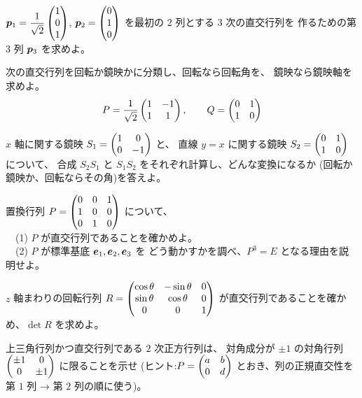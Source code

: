 \begin{mondai}[基本]\label{q:orth-ex4}
$\bm{p}_1 = \dfrac{1}{\sqrt{2}}\begin{pmatrix}1 \\ 0 \\ 1\end{pmatrix}$,
$\bm{p}_2 = \begin{pmatrix}0 \\ 1 \\ 0\end{pmatrix}$ を最初の $2$ 列とする $3$ 次の直交行列を
作るための第 $3$ 列 $\bm{p}_3$ を求めよ。
\end{mondai}

\begin{mondai}[標準]\label{q:orth-ex5}
次の直交行列を回転か鏡映かに分類し、回転なら回転角を、
鏡映なら鏡映軸を求めよ。
\[
P = \frac{1}{\sqrt{2}}\begin{pmatrix}1 & -1 \\ 1 & 1\end{pmatrix}, \qquad
Q = \begin{pmatrix}0 & 1 \\ 1 & 0\end{pmatrix}
\]
\end{mondai}

\begin{mondai}[標準]\label{q:orth-ex6}
$x$ 軸に関する鏡映 $S_1 = \begin{pmatrix}1 & 0 \\ 0 & -1\end{pmatrix}$ と、
直線 $y = x$ に関する鏡映 $S_2 = \begin{pmatrix}0 & 1 \\ 1 & 0\end{pmatrix}$ について、
合成 $S_2 S_1$ と $S_1 S_2$ をそれぞれ計算し、どんな変換になるか
(回転か鏡映か、回転ならその角)を答えよ。
\end{mondai}

\begin{mondai}[標準]\label{q:orth-ex7}
置換行列 $P = \begin{pmatrix}0 & 0 & 1 \\ 1 & 0 & 0 \\ 0 & 1 & 0\end{pmatrix}$ について、\\
　(1) $P$ が直交行列であることを確かめよ。\\
　(2) $P$ が標準基底 $\bm{e}_1, \bm{e}_2, \bm{e}_3$ を
どう動かすかを調べ、$P^3 = E$ となる理由を説明せよ。
\end{mondai}

\begin{mondai}[標準]\label{q:orth-ex8}
$z$ 軸まわりの回転行列
$R = \begin{pmatrix}\cos\theta & -\sin\theta & 0 \\ \sin\theta & \cos\theta & 0 \\ 0 & 0 & 1\end{pmatrix}$
が直交行列であることを確かめ、$\det R$ を求めよ。
\end{mondai}

\begin{mondai}[発展]\label{q:orth-ex9}
上三角行列かつ直交行列である $2$ 次正方行列は、
対角成分が $\pm 1$ の対角行列
$\begin{pmatrix}\pm 1 & 0 \\ 0 & \pm 1\end{pmatrix}$ に限ることを示せ
(ヒント:$P = \begin{pmatrix}a & b \\ 0 & d\end{pmatrix}$ とおき、列の正規直交性を
第 $1$ 列 → 第 $2$ 列の順に使う)。
\end{mondai}


